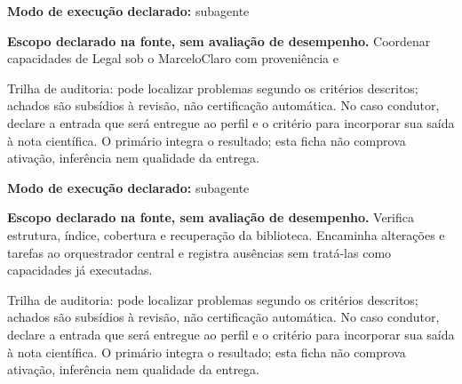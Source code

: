 \begin{arquitetura}
\textbf{Modo de execução declarado:} subagente
\end{arquitetura}


\begin{descricao}
\textbf{Escopo declarado na fonte, sem avaliação de desempenho.}
Coordenar capacidades de Legal sob o MarceloClaro com proveniência e
\end{descricao}

\begin{funcao}
Trilha de auditoria: pode localizar problemas segundo os critérios descritos; achados são subsídios à revisão, não certificação automática. No caso condutor, declare a entrada que será entregue ao perfil e o critério para incorporar sua saída à nota científica. O primário integra o resultado; esta ficha não comprova ativação, inferência nem qualidade da entrega.
\end{funcao}

\begin{arquitetura}
\textbf{Modo de execução declarado:} subagente
\end{arquitetura}


\begin{descricao}
\textbf{Escopo declarado na fonte, sem avaliação de desempenho.}
Verifica estrutura, índice, cobertura e recuperação da biblioteca. Encaminha alterações e tarefas ao orquestrador central e registra ausências sem tratá-las como capacidades já executadas.
\end{descricao}

\begin{funcao}
Trilha de auditoria: pode localizar problemas segundo os critérios descritos; achados são subsídios à revisão, não certificação automática. No caso condutor, declare a entrada que será entregue ao perfil e o critério para incorporar sua saída à nota científica. O primário integra o resultado; esta ficha não comprova ativação, inferência nem qualidade da entrega.
\end{funcao}

